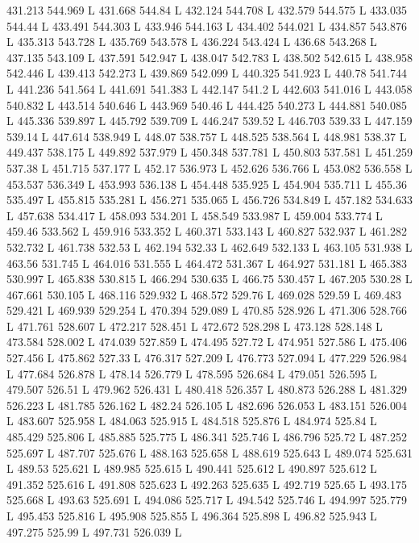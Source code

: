 431.213 544.969 L
431.668 544.84 L
432.124 544.708 L
432.579 544.575 L
433.035 544.44 L
433.491 544.303 L
433.946 544.163 L
434.402 544.021 L
434.857 543.876 L
435.313 543.728 L
435.769 543.578 L
436.224 543.424 L
436.68 543.268 L
437.135 543.109 L
437.591 542.947 L
438.047 542.783 L
438.502 542.615 L
438.958 542.446 L
439.413 542.273 L
439.869 542.099 L
440.325 541.923 L
440.78 541.744 L
441.236 541.564 L
441.691 541.383 L
442.147 541.2 L
442.603 541.016 L
443.058 540.832 L
443.514 540.646 L
443.969 540.46 L
444.425 540.273 L
444.881 540.085 L
445.336 539.897 L
445.792 539.709 L
446.247 539.52 L
446.703 539.33 L
447.159 539.14 L
447.614 538.949 L
448.07 538.757 L
448.525 538.564 L
448.981 538.37 L
449.437 538.175 L
449.892 537.979 L
450.348 537.781 L
450.803 537.581 L
451.259 537.38 L
451.715 537.177 L
452.17 536.973 L
452.626 536.766 L
453.082 536.558 L
453.537 536.349 L
453.993 536.138 L
454.448 535.925 L
454.904 535.711 L
455.36 535.497 L
455.815 535.281 L
456.271 535.065 L
456.726 534.849 L
457.182 534.633 L
457.638 534.417 L
458.093 534.201 L
458.549 533.987 L
459.004 533.774 L
459.46 533.562 L
459.916 533.352 L
460.371 533.143 L
460.827 532.937 L
461.282 532.732 L
461.738 532.53 L
462.194 532.33 L
462.649 532.133 L
463.105 531.938 L
463.56 531.745 L
464.016 531.555 L
464.472 531.367 L
464.927 531.181 L
465.383 530.997 L
465.838 530.815 L
466.294 530.635 L
466.75 530.457 L
467.205 530.28 L
467.661 530.105 L
468.116 529.932 L
468.572 529.76 L
469.028 529.59 L
469.483 529.421 L
469.939 529.254 L
470.394 529.089 L
470.85 528.926 L
471.306 528.766 L
471.761 528.607 L
472.217 528.451 L
472.672 528.298 L
473.128 528.148 L
473.584 528.002 L
474.039 527.859 L
474.495 527.72 L
474.951 527.586 L
475.406 527.456 L
475.862 527.33 L
476.317 527.209 L
476.773 527.094 L
477.229 526.984 L
477.684 526.878 L
478.14 526.779 L
478.595 526.684 L
479.051 526.595 L
479.507 526.51 L
479.962 526.431 L
480.418 526.357 L
480.873 526.288 L
481.329 526.223 L
481.785 526.162 L
482.24 526.105 L
482.696 526.053 L
483.151 526.004 L
483.607 525.958 L
484.063 525.915 L
484.518 525.876 L
484.974 525.84 L
485.429 525.806 L
485.885 525.775 L
486.341 525.746 L
486.796 525.72 L
487.252 525.697 L
487.707 525.676 L
488.163 525.658 L
488.619 525.643 L
489.074 525.631 L
489.53 525.621 L
489.985 525.615 L
490.441 525.612 L
490.897 525.612 L
491.352 525.616 L
491.808 525.623 L
492.263 525.635 L
492.719 525.65 L
493.175 525.668 L
493.63 525.691 L
494.086 525.717 L
494.542 525.746 L
494.997 525.779 L
495.453 525.816 L
495.908 525.855 L
496.364 525.898 L
496.82 525.943 L
497.275 525.99 L
497.731 526.039 L
